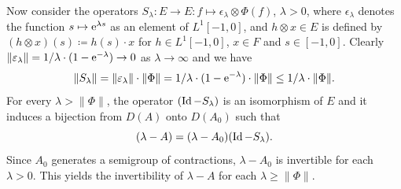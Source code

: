 Now consider the operators $S_{\lambda} \colon E \to E \colon f \mapsto \epsilon_{\lambda} \otimes \Phi(f)$, $\lambda > 0$, where $\epsilon_{\lambda}$ denotes the function $s \mapsto \mathrm{e}^{\lambda s}$ as an element of\/ $L^{1}[-1,0]$, 
and $h \otimes x \in E$ is defined by 
$(h \otimes x)(s) \coloneqq h(s) \cdot x$ for $h \in L^{1}[-1,0]$, $x \in F$ and $s \in [-1,0]$.
Clearly 
$\|\epsilon_{\lambda}\| = 1/\lambda \cdot (1 - \eu^{-\lambda}) \to 0$ as $\lambda \to \infty$ and we have
\[
\|S_{\lambda}\| = \|\epsilon_{\lambda}\| \cdot \|\Phi\| = 1/\lambda \cdot (1 - \eu^{-\lambda}) \cdot \|\Phi\| \leq 1/\lambda \cdot \|\Phi\| .
\]
For every $\lambda > \|\Phi\|$, the operator $(\operatorname{Id} - S_{\lambda})$ is an isomorphism of\/ $E$ and it induces a bijection from $D(A)$ onto $D(A_{0})$ such that
\begin{equation}\label{eq:c4-3.2}
(\lambda - A) = (\lambda - A_{0})(\operatorname{Id} - S_{\lambda}).
\end{equation}
Since $A_{0}$ generates a semigroup of contractions, $\lambda - A_{0}$ is invertible for each $\lambda > 0$.
This yields the invertibility of\/ $\lambda - A$ for each $\lambda \geq \|\Phi\|$.

